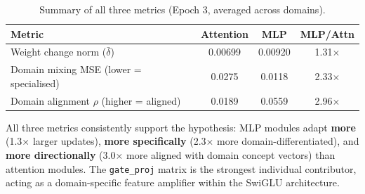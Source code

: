\documentclass[11pt,a4paper]{article}
\begin{document}
\begin{table}[H]
\centering
\caption{Summary of all three metrics (Epoch 3, averaged across domains).}
\label{tab:summary}
\begin{tabular}{lccc}
\toprule
Metric & Attention & MLP & MLP/Attn \\
\midrule
Weight change norm ($\bar{\delta}$)         & 0.00699 & 0.00920 & 1.31$\times$ \\
Domain mixing MSE (lower = specialised)     & 0.0275  & 0.0118  & 2.33$\times$ \\
Domain alignment $\rho$ (higher = aligned)  & 0.0189  & 0.0559  & 2.96$\times$ \\
\bottomrule
\end{tabular}
\end{table}

All three metrics consistently support the hypothesis: MLP modules adapt \textbf{more} (1.3$\times$ larger updates), \textbf{more specifically} (2.3$\times$ more domain-differentiated), and \textbf{more directionally} (3.0$\times$ more aligned with domain concept vectors) than attention modules. The \texttt{gate\_proj} matrix is the strongest individual contributor, acting as a domain-specific feature amplifier within the SwiGLU architecture.
\end{document}
